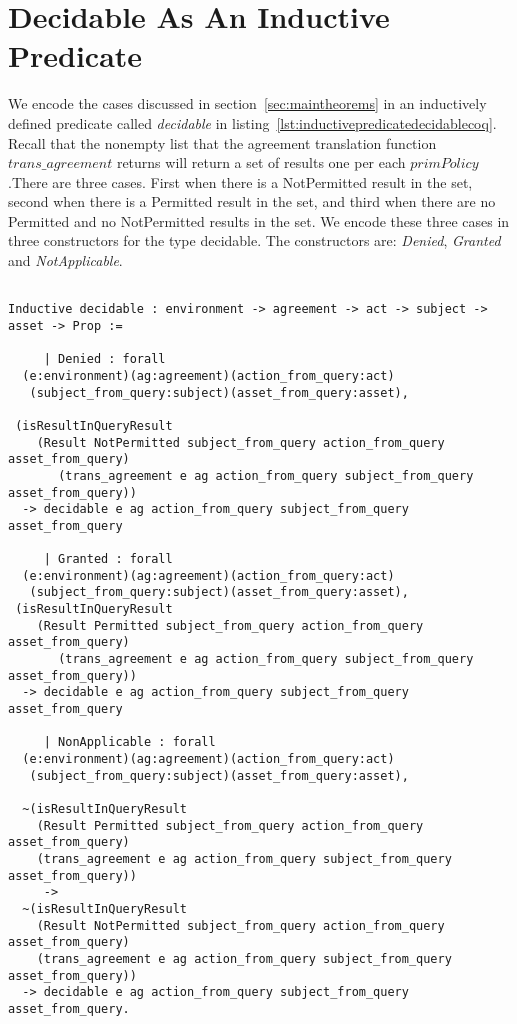 \section{Decidable As An Inductive Predicate}

We encode the cases discussed in section~\ref{sec:maintheorems} in an inductively defined predicate called \emph{decidable} in listing~\ref{lst:inductivepredicatedecidablecoq}. Recall that the nonempty list that the agreement translation function $trans\_agreement$ returns will return a set of results one per each $primPolicy$.There are three cases. First when there is a NotPermitted result in the set, second when there is a Permitted result in the set, and third when there are no Permitted and no NotPermitted results in the set. We encode these three cases in three constructors for the type decidable. The constructors are: \emph{Denied}, \emph{Granted} and \emph{NotApplicable}.

\begin{lstlisting}

Inductive decidable : environment -> agreement -> act -> subject -> asset -> Prop :=

     | Denied : forall
  (e:environment)(ag:agreement)(action_from_query:act)
   (subject_from_query:subject)(asset_from_query:asset), 

 (isResultInQueryResult 
    (Result NotPermitted subject_from_query action_from_query asset_from_query)
       (trans_agreement e ag action_from_query subject_from_query asset_from_query)) 
  -> decidable e ag action_from_query subject_from_query asset_from_query

     | Granted : forall
  (e:environment)(ag:agreement)(action_from_query:act)
   (subject_from_query:subject)(asset_from_query:asset), 
 (isResultInQueryResult 
    (Result Permitted subject_from_query action_from_query asset_from_query)
       (trans_agreement e ag action_from_query subject_from_query asset_from_query)) 
  -> decidable e ag action_from_query subject_from_query asset_from_query

     | NonApplicable : forall
  (e:environment)(ag:agreement)(action_from_query:act)
   (subject_from_query:subject)(asset_from_query:asset), 

  ~(isResultInQueryResult 
    (Result Permitted subject_from_query action_from_query asset_from_query)
    (trans_agreement e ag action_from_query subject_from_query asset_from_query)) 
     ->
  ~(isResultInQueryResult 
    (Result NotPermitted subject_from_query action_from_query asset_from_query)
    (trans_agreement e ag action_from_query subject_from_query asset_from_query)) 
  -> decidable e ag action_from_query subject_from_query asset_from_query.
\end{lstlisting}


